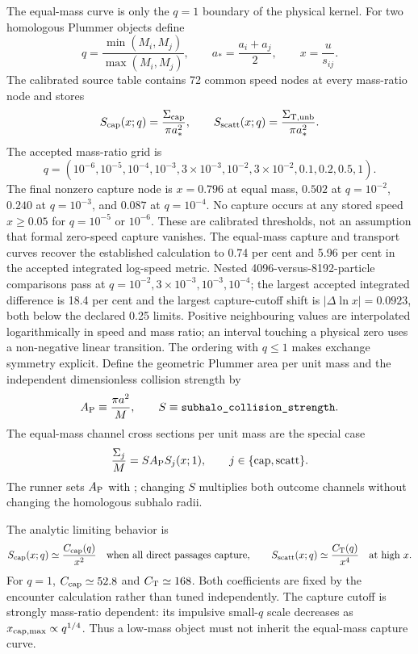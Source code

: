 The equal-mass curve is only the \(q=1\) boundary of the physical kernel.
For two homologous Plummer objects define
\[
 q=\frac{\min(M_i,M_j)}{\max(M_i,M_j)},\qquad
 a_*=\frac{a_i+a_j}{2},\qquad
 x=\frac{u}{s_{ij}}.
\]
The calibrated source table contains 72 common speed nodes at every mass-ratio
node and stores
\[
 S_{\rm cap}(x;q)=\frac{\Sigma_{\rm cap}}{\pi a_*^2},
 \qquad
 S_{\rm scatt}(x;q)=
 \frac{\Sigma_{{\rm T},{\rm unb}}}{\pi a_*^2}.
\]
The accepted mass-ratio grid is
\[
 q=(10^{-6},10^{-5},10^{-4},10^{-3},3\times10^{-3},
 10^{-2},3\times10^{-2},0.1,0.2,0.5,1).
\]
The final nonzero capture node is \(x=0.796\) at equal mass,
\(0.502\) at \(q=10^{-2}\), \(0.240\) at \(q=10^{-3}\), and
\(0.087\) at \(q=10^{-4}\).  No capture occurs at any stored speed
\(x\ge0.05\) for \(q=10^{-5}\) or \(10^{-6}\).  These are calibrated
thresholds, not an assumption that formal zero-speed capture vanishes.
The equal-mass capture and transport curves recover the established
calculation to 0.74 per cent and 5.96 per cent in the accepted integrated
log-speed metric.  Nested 4096-versus-8192-particle comparisons pass at
\(q=10^{-2},3\times10^{-3},10^{-3},10^{-4}\); the largest accepted
integrated difference is 18.4 per cent and the largest capture-cutoff shift
is \(|\Delta\ln x|=0.0923\), both below the declared 0.25 limits.
Positive neighbouring values are interpolated logarithmically in speed and
mass ratio; an interval touching a physical zero uses a non-negative linear
transition.  The ordering with \(q\le1\) makes exchange symmetry explicit.
Define the geometric Plummer area per unit mass and the independent
dimensionless collision strength by
\[
 A_{\rm P}\equiv\frac{\pi a^2}{M},
 \qquad S\equiv\code{subhalo_collision_strength}.
\]
The equal-mass channel cross sections per unit mass are the special case
\[
 \frac{\Sigma_j}{M}
 =S A_{\rm P}S_j(x;1),
 \qquad j\in\{\mathrm{cap},\mathrm{scatt}\}.
\]
The runner sets \(A_{\rm P}\) with
; changing \(S\) multiplies both outcome
channels without changing the homologous subhalo radii.

The analytic limiting behavior is
\[
 S_{\rm cap}(x;q)\simeq\frac{C_{\rm cap}(q)}{x^2}
 \quad\text{when all direct passages capture},
\qquad
 S_{\rm scatt}(x;q)\simeq\frac{C_{\rm T}(q)}{x^4}
 \quad\text{at high }x.
\]
For \(q=1\), \(C_{\rm cap}\simeq52.8\) and
\(C_{\rm T}\simeq168\).  Both coefficients are fixed by the encounter
calculation rather than tuned independently.  The capture cutoff is strongly
mass-ratio dependent: its impulsive small-\(q\) scale decreases as
\(x_{\rm cap,max}\propto q^{1/4}\).  Thus a low-mass object must not inherit
the equal-mass capture curve.

